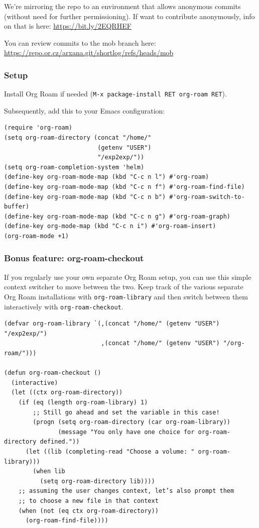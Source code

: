 \documentclass[11pt]{article}
\begin{document}
We’re mirroring the repo to an environment that allows anonymous
commits (without need for further permissioning).  If want to
contribute anonymously, info on that is here: \href{https://bit.ly/2EQRHEF}{https://bit.ly/2EQRHEF}

You can review commits to the mob branch here: \href{https://repo.or.cz/arxana.git/shortlog/refs/heads/mob}{https://repo.or.cz/arxana.git/shortlog/refs/heads/mob}

\subsubsection{Setup}
\label{sec:org3b32dec}

Install Org Roam if needed (\texttt{M-x package-install RET org-roam RET}).

Subsequently, add this to your Emacs configuration:

\begin{verbatim}
(require 'org-roam)
(setq org-roam-directory (concat "/home/"
                          (getenv "USER")
                          "/exp2exp/"))
(setq org-roam-completion-system 'helm)
(define-key org-roam-mode-map (kbd "C-c n l") #'org-roam)
(define-key org-roam-mode-map (kbd "C-c n f") #'org-roam-find-file)
(define-key org-roam-mode-map (kbd "C-c n b") #'org-roam-switch-to-buffer)
(define-key org-roam-mode-map (kbd "C-c n g") #'org-roam-graph)
(define-key org-mode-map (kbd "C-c n i") #'org-roam-insert)
(org-roam-mode +1)
\end{verbatim}
\subsubsection{Bonus feature: org-roam-checkout}
\label{sec:org5781f9a}

If you regularly use your own separate Org Roam setup, you can use
this simple context switcher to move between the two.  Keep track of
the various separate Org Roam installations with \texttt{org-roam-library}
and then switch between them interactively with \texttt{org-roam-checkout}.

\begin{verbatim}
(defvar org-roam-library `(,(concat "/home/" (getenv "USER") "/exp2exp/")
                           ,(concat "/home/" (getenv "USER") "/org-roam/")))

(defun org-roam-checkout ()
  (interactive)
  (let ((ctx org-roam-directory))
    (if (eq (length org-roam-library) 1)
        ;; Still go ahead and set the variable in this case!
        (progn (setq org-roam-directory (car org-roam-library))
               (message "You only have one choice for org-roam-directory defined."))
      (let ((lib (completing-read "Choose a volume: " org-roam-library)))
        (when lib
          (setq org-roam-directory lib))))
    ;; assuming the user changes context, let’s also prompt them
    ;; to choose a new file in that context
    (when (not (eq ctx org-roam-directory))
      (org-roam-find-file))))
\end{verbatim}
\end{document}
